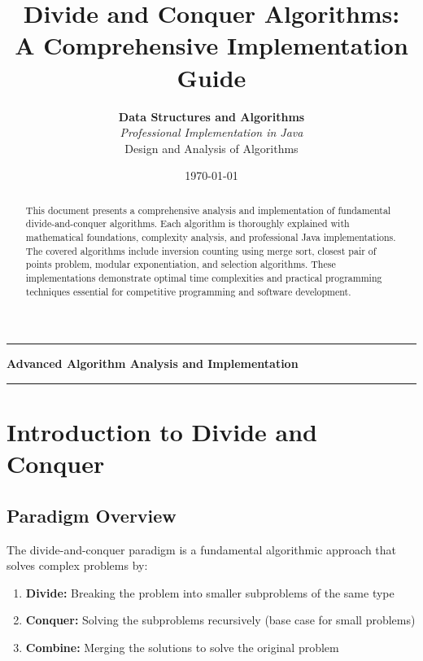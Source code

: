 \documentclass[12pt,a4paper]{article}
\title{\textbf{Divide and Conquer Algorithms:\\A Comprehensive Implementation Guide}}
\author{
    \textbf{Data Structures and Algorithms}\\
    \textit{Professional Implementation in Java}\\
    \vspace{0.5em}
    \small Design and Analysis of Algorithms
}
\date{\today}
\begin{document}
\maketitle

\begin{center}
\rule{\textwidth}{2pt}
\vspace{0.5em}
\large \textbf{Advanced Algorithm Analysis and Implementation}
\vspace{0.5em}
\rule{\textwidth}{1pt}
\end{center}

\vspace{2em}

\begin{abstract}
This document presents a comprehensive analysis and implementation of fundamental divide-and-conquer algorithms. Each algorithm is thoroughly explained with mathematical foundations, complexity analysis, and professional Java implementations. The covered algorithms include inversion counting using merge sort, closest pair of points problem, modular exponentiation, and selection algorithms. These implementations demonstrate optimal time complexities and practical programming techniques essential for competitive programming and software development.
\end{abstract}

\vspace{1em}
\tableofcontents
\newpage

\section{Introduction to Divide and Conquer}

\subsection{Paradigm Overview}
The divide-and-conquer paradigm is a fundamental algorithmic approach that solves complex problems by:

\begin{enumerate}[itemsep=0.5em]
    \item \textbf{Divide:} Breaking the problem into smaller subproblems of the same type
    \item \textbf{Conquer:} Solving the subproblems recursively (base case for small problems)
    \item \textbf{Combine:} Merging the solutions to solve the original problem
\end{enumerate}
\end{document}
